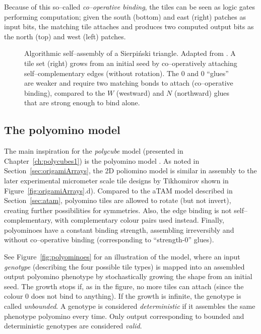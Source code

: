Because of this so--called \emph{co--operative binding}, the tiles can be seen as logic gates performing computation; given the south (bottom) and east (right) patches as input bits, the matching tile attaches and produces two computed output bits as the north (top) and west (left) patches.



\begin{figure}[h]
  \centering
  \caption{Algorithmic self--assembly of a Sierpiński triangle. Adapted from \cite{doty2017}. A tile set (right) grows from an initial seed by co--operatively attaching self--complementary edges (without rotation). The \(0\) and \(0\) ``glues'' are weaker and require two matching bonds to attach (co--operative binding), compared to the \(W\) (westward) and \(N\) (northward) glues that are strong enough to bind alone.}
  \label{fig:atam}
\end{figure}

\subsection{The polyomino model}\label{sec:polyomino}


The main inspiration for the \emph{polycube} model (presented in Chapter~\ref{ch:polycubes1}) is the polyomino model \cite{ahnert2010self, johnston2011evolutionary}. As noted in Section~\ref{sec:origamiArrays}, the 2D poliomino model is similar in assembly to the later experimental micrometer scale tile designs by Tikhomirov \cite{tikhomirov2017programmable} shown in Figure~\ref{fig:origamiArrays}.d). Compared to the aTAM model described in Section~\ref{sec:atam}, polyomino tiles are allowed to rotate (but not invert), creating further possibilities for symmetries. Also, the edge binding is not self--complementary, with complementary colour pairs used instead. Finally, polyominoes have a constant binding strength, assembling irreversibly and without co--operative binding (corresponding to ``strength-0'' glues).

See Figure~\ref{fig:polyominoes} for an illustration of the model, where an input \emph{genotype} (describing the four possible tile types) is mapped into an assembled output polyomino phenotype by stochastically growing the shape from an initial seed. The growth stops if, as in the figure, no more tiles can attach (since the colour \(0\) does not bind to anything). If the growth is infinite, the genotype is called \emph{unbounded}. A genotype is considered \emph{deterministic} if it assembles the same phenotype polyomino every time. Only output corresponding to bounded and deterministic genotypes are considered \emph{valid}.

